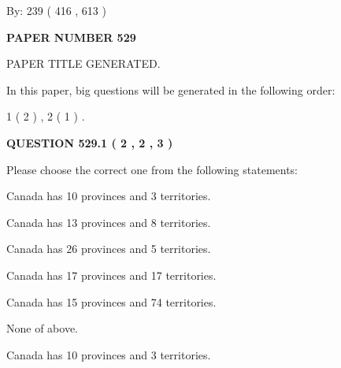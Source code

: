 \documentclass[12pt]{article}
\begin{document}
   
\hspace{1.0in} By: 
 239 ( 416 ,  613 )
   
   
   
   
\newpage 
\setcounter{page}{ 
   529001 } 
   
   
   
   
 {\textbf{ \Large{ PAPER NUMBER  529  }}}
   
   
\vspace{0.2in}
   
   
   
   
   
   
   
   
 \vspace{0.2in}
 
 
 
 
   
   
 PAPER TITLE GENERATED.
   
   
   
\vspace{0.2in}
   
In this paper, big questions will be generated in the following order: 
   
   
   1 ( 2 )
 ,
   2 ( 1 )
 .
  
\vspace{0.2in}
  
{\textbf{\Large{QUESTION
529.1 
 ( 2 , 2 , 3 )
}}}
  
  
Please choose the correct one from the following statements:
 
 
Canada has 10  provinces and 3 territories.
 
 
Canada has  13 provinces and  8 territories.
 
 
Canada has  26 provinces and  5 territories.
 
 
Canada has  17 provinces and  17 territories.
 
 
Canada has  15 provinces and  74 territories.
 
 
 None of above.
 
 
\noindent{}
 
 
Canada has 10  provinces and 3 territories.
 
\end{document}
